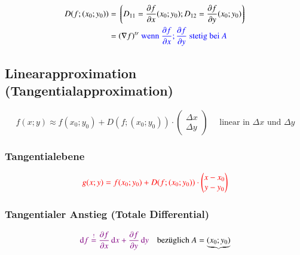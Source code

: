 \[
    \begin{split}
        D(f;(x_{0}; y_{0})) &= \left\lgroup D_{11} = \frac{\partial f}{\partial x}(x_{0}; y_{0}); 
                                            D_{12} = \frac{\partial f}{\partial y}(x_{0}; y_{0})\right\rgroup\\
        &= (\nabla f)^{tr} \text{ {\color{blue}wenn $\frac{\partial f}{\partial x}; \frac{\partial f}{\partial y}$ stetig bei $A$}}
    \end{split}
\]



\subsection{Linearapproximation (Tangentialapproximation)}
\[
    f(x;y) \approx f(x_{0}; y_{0}) + D(f;(x_{0}; y_{0}))\cdot \begin{pmatrix}
        \Delta x\\
        \Delta y
    \end{pmatrix}
    \quad\text{ linear in $\Delta x$ und $\Delta y$}
\]


\subsubsection{Tangentialebene}
\[
    {\color{red}g(x; y) = f(x_{0}; y_{0}) + D(f;(x_{0}; y_{0}))\cdot \begin{pmatrix}
        x - x_{0}\\
        y - y_{0}
    \end{pmatrix}}
\]


\subsubsection{Tangentialer Anstieg (Totale Differential)}
\[
    \cvt{\diff f \overset{!}{=} 
        \frac{\partial f}{\partial \tikznode{ptx}{x}}\diff x + 
        \frac{\partial f}{\partial \tikznode{pty}{y}}\diff y} 
        \quad \text{bezüglich } A=\underbrace{(x_{0}; y_{0})}_{\tikznode{axy}{}}
\]


